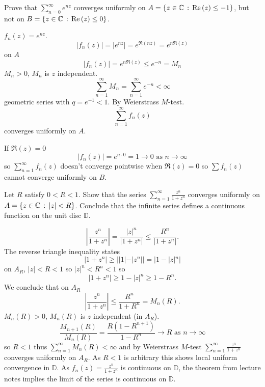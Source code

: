 \documentclass[10pt, a4paper]{article}
\begin{document}
\begin{problem}
    Prove that $\sum_{n = 0}^{\infty}e ^ {nz}$ converges uniformly on $A = \{z \in \mathbb{C}\,:\,\mathrm{Re}\,(z) \leq -1\}$,
    but not on $B = \{z \in \mathbb{C}\,:\, \mathrm{Re}\,(z) \leq 0\}$.

    \begin{solution}
        $f_n(z) = e ^  {nz}$.
        \[
        |f_n(z)| = |e ^ {nz}| = e ^ {\Re(nz)} = e ^ {n\Re(z)}
        \]
        on $A$
        \[
        |f_n(z)| = e ^ {n\Re(z)} \leq e ^ {-n} = M_n
        \]
        $M_n > 0$,
        $M_n$ is $z$ independent.
        \[
        \sum_{n = 1}^{\infty}M_n = \sum_{n = 1}^{\infty}e ^ {-n} < \infty
        \]
        geometric series with $q = e ^ {-1} < 1$.
        By Weierstrass $M$-test.
        \[
        \sum_{n = 1}^{\infty}f_n(z)
        \]
        converges uniformly on $A$.

        If $\Re(z) = 0$
        \[
        |f_n(z)| = e ^ {n\cdot 0} = 1 \to 0\text{ as } n \to \infty
        \]
        so $\sum_{n = 1}^{\infty}f_n(z)$ doesn't converge pointwise when $\Re(z) = 0$ so $\sum f_n(z)$ cannot converge uniformly on $B$.
    \end{solution}
\end{problem}

\begin{problem}
    Let $R$ satisfy $0 < R < 1$.
    Show that the series $\displaystyle\sum_{n = 1}^{\infty}\frac{z ^ n}{1 + z ^ n}$ converges uniformly on $A = \{z \in \mathbb{C}\,:\,|z| < R\}$.
    Conclude that the infinite series defines a continuous function on the unit disc $\mathbb{D}$.

    \begin{solution}
        \[
        \left|\frac{z ^ n}{1 + z ^ n}\right| = \frac{|z| ^ n}{|1 + z ^ n|} \leq \frac{R ^ n}{|1 + z ^ n|}.
        \]
        The reverse triangle inequality states
        \[
        |1 + z ^ n| \geq ||1| - |z ^ n|| = |1 - |z| ^ n|
        \]
        on $A_R$,
        $|z| < R < 1$ so $|z| ^ n < R ^ n < 1$ so
        \[
        |1 + z ^ n| \geq 1 - |z| ^ n \geq 1 - R ^ n.
        \]
        We conclude that on $A_R$
        \[
        \left|\frac{z ^ n}{1 + z ^ n}\right| \leq \frac{R ^ n}{1 + R ^ n} = M_n(R).
        \]
        $M_n(R) > 0$,
        $M_n(R)$ is $z$ independent
        (in $A_R$).
        \[
        \frac{M_{n + 1}(R)}{M_n(R)} = \frac{R(1 - R ^ {n + 1})}{1 - R ^ n} \to R\text{ as } n \to \infty
        \]
        so $R < 1$ thus $\sum_{n = 1}^{\infty}M_n(R) < \infty$ and by Weierstrass $M$-test $\sum_{n = 1}^{\infty}\frac{z ^ n}{1 + z ^ n}$ converges uniformly on $A_R$.
        As $R < 1$ is arbitrary this shows local uniform convergence in $\mathbb{D}$.
        As $f_n(z) = \frac{z ^ n}{1 + z ^ n}$ is continuous on $\mathbb{D}$,
        the theorem from lecture notes implies the limit of the series is continuous on $\mathbb{D}$.
    \end{solution}
\end{problem}
\end{document}
